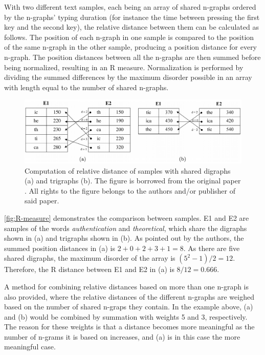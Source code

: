 \documentclass[informationsecurity]{gucmasterproject}
\begin{document}
With two different text samples, each being an array of shared n-graphs ordered by the n-graphs' typing duration (for instance the time between pressing the first key and the second key), the relative distance between them can be calculated as follows.
The position of each n-graph in one sample is compared to the position of the same n-graph in the other sample, producing a position distance for every n-graph.
The position distances between all the n-graphs are then summed before being normalized, resulting in an R measure.
Normalization is performed by dividing the summed differences by the maximum disorder possible in an array with length equal to the number of shared n-graphs.

\begin{figure}[h]
    \centering
    \includegraphics[width=1\textwidth]{gunetti/R-measure}
    \caption{Computation of relative distance of samples with shared digraphs (a) and trigraphs (b). The figure is borrowed from the original paper \cite{gnp}. All rights to the figure belongs to the authors and/or publisher of said paper.}
    \label{fig:R-measure}
\end{figure}

\autoref{fig:R-measure} demonstrates the comparison between samples.
E1 and E2 are samples of the words \textit{authentication} and \textit{theoretical}, which share the digraphs shown in (a) and trigraphs shown in (b).
As pointed out by the authors, the summed position distances in (a) is $2+0+2+3+1=8$.
As there are five shared digraphs, the maximum disorder of the array is $(5^2-1)/2=12$.
Therefore, the R distance between E1 and E2 in (a) is $8/12 = 0.666$.

A method for combining relative distances based on more than one n-graph is also provided, where the relative distances of the different n-graphs are weighed based on the number of shared n-graps they contain. 
In the example above, (a) and (b) would be combined by summation with weights 5 and 3, respectively.
The reason for these weights is that a distance becomes more meaningful as the number of n-grams it is based on increases, and (a) is in this case the more meaningful case.
\end{document}
